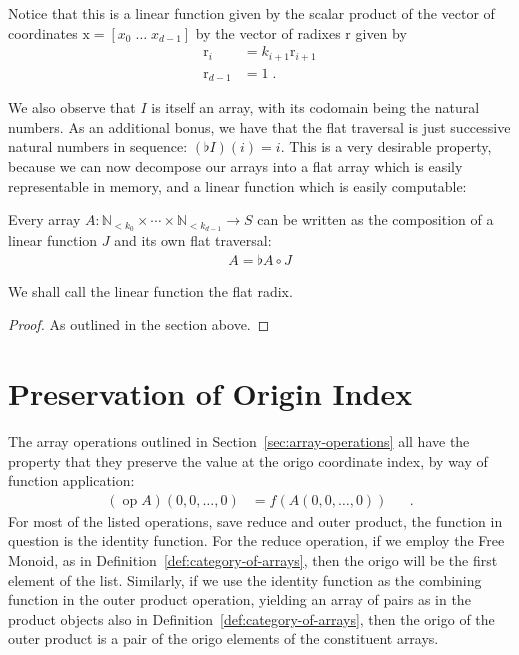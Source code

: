 \documentclass{DIKU-report-variant}
\newcommand\mrm[1]{\mathrm{#1}}
\newcommand\brm[1]{\bm{\mrm{#1}}}
\newcommand\Nat{\mathbb{N}}
\begin{document}
Notice that this is a linear function given by the scalar product of the vector of coordinates
\(\brm x = [x_0\; \dots\; x_{d-1}]\) by the vector of radixes \(\brm r\) given by
\begin{align*}
  \brm r_i &= k_{i+1} \brm r_{i+1} \\
  \brm r_{d-1} &= 1 \;.
\end{align*}

We also observe that \(I\) is itself an array, with its codomain being the natural numbers. As an additional
bonus, we have that the flat traversal is just successive natural numbers in sequence: \((\flat I)(i) = i\).
This is a very desirable property, because we can now decompose our arrays into a flat array which is easily
representable in memory, and a linear function which is easily computable:
\begin{theorem}
  \label{the:linear-decompose}
  Every array \(A : \Nat_{<k_0} \times \cdots \times \Nat_{<k_{d-1}} \to S\) can be written as
  the composition of a linear function \(J\) and its own flat traversal:
  \begin{align*}
    A = \flat A \circ J
  \end{align*}
  
  We shall call the linear function the flat radix.
\end{theorem}
\begin{proof}
  As outlined in the section above.
\end{proof}

\section{Preservation of Origin Index}

The array operations outlined in Section~\ref{sec:array-operations} all have the
property that they preserve the value at the origo coordinate index, by way of function
application:
\begin{align*}
  (\operatorname{op} A)(0, 0,\dots,0) &= f(A(0, 0, \dots, 0)) && .
\end{align*}
For most of the listed operations, save reduce and outer product, the function in question is the
identity function. For the reduce operation, if we employ the Free Monoid, as in
Definition~\ref{def:category-of-arrays}, then the origo will be the first element of the list.
Similarly, if we use the identity function as the combining function in the outer product operation,
yielding an array of pairs as in the product objects also in Definition~\ref{def:category-of-arrays},
then the origo of the outer product is a pair of the origo elements of the constituent arrays.
\end{document}
